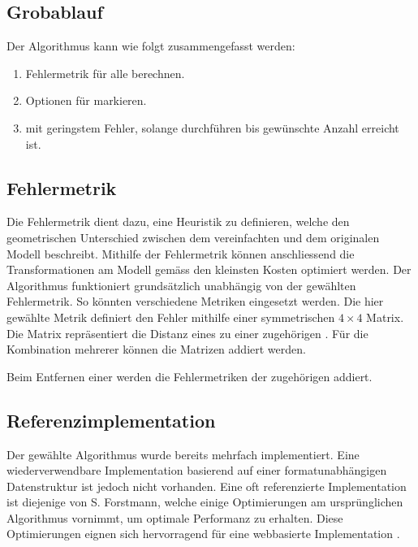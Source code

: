 \subsection{Grobablauf}
Der Algorithmus kann wie folgt zusammengefasst werden:

\begin{enumerate}
  \item Fehlermetrik für alle  berechnen.
  \item Optionen für  markieren.
  \item {} mit geringstem Fehler, solange durchführen bis gewünschte Anzahl  erreicht ist.
\end{enumerate}


\subsection{Fehlermetrik}
Die Fehlermetrik dient dazu, eine Heuristik zu definieren, welche den geometrischen Unterschied zwischen dem vereinfachten und dem originalen Modell beschreibt.
Mithilfe der Fehlermetrik können anschliessend die Transformationen am Modell gemäss den kleinsten Kosten optimiert werden. Der Algorithmus funktioniert grundsätzlich unabhängig von der gewählten Fehlermetrik. So könnten verschiedene Metriken eingesetzt werden.
Die hier gewählte Metrik definiert den Fehler mithilfe einer symmetrischen $4\times 4$ Matrix. Die Matrix repräsentiert die Distanz eines  zu einer zugehörigen . Für die Kombination mehrerer  können die Matrizen addiert werden.

Beim Entfernen einer  werden die Fehlermetriken der zugehörigen  addiert.


\subsection{Referenzimplementation}
Der gewählte Algorithmus wurde bereits mehrfach implementiert. Eine wiederverwendbare Implementation basierend auf einer formatunabhängigen Datenstruktur ist jedoch nicht vorhanden. Eine oft referenzierte Implementation ist diejenige von S. Forstmann, welche einige Optimierungen am ursprünglichen Algorithmus vornimmt, um optimale Performanz zu erhalten. Diese Optimierungen eignen sich hervorragend für eine webbasierte Implementation \cite{fastQuadricMeshSimplification}.


